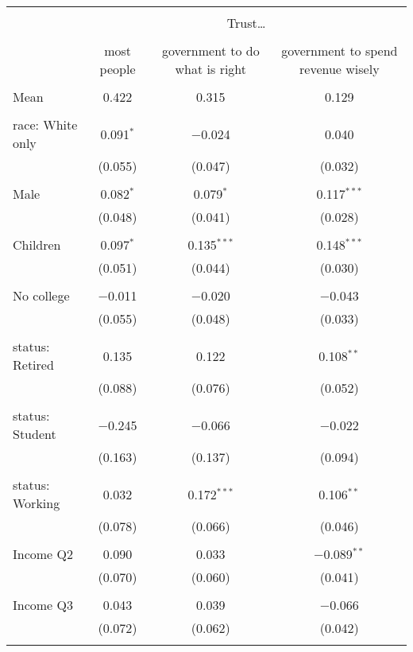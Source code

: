 
\begin{tabular}{@{\extracolsep{5pt}}lccc} 
\\[-1.8ex]\hline 
\hline \\[-1.8ex] 
 & \multicolumn{3}{c}{Trust…} \\ 
\cline{2-4} 
\\[-1.8ex] & most people & government to do what is right & government to spend revenue wisely \\ 
\hline \\[-1.8ex] 
 Mean & 0.422 & 0.315 & 0.129  \\ \hline \\[-1.8ex] race: White only & 0.091$^{*}$ & $-$0.024 & 0.040 \\ 
  & (0.055) & (0.047) & (0.032) \\ 
  & & & \\ 
 Male & 0.082$^{*}$ & 0.079$^{*}$ & 0.117$^{***}$ \\ 
  & (0.048) & (0.041) & (0.028) \\ 
  & & & \\ 
 Children & 0.097$^{*}$ & 0.135$^{***}$ & 0.148$^{***}$ \\ 
  & (0.051) & (0.044) & (0.030) \\ 
  & & & \\ 
 No college & $-$0.011 & $-$0.020 & $-$0.043 \\ 
  & (0.055) & (0.048) & (0.033) \\ 
  & & & \\ 
 status: Retired & 0.135 & 0.122 & 0.108$^{**}$ \\ 
  & (0.088) & (0.076) & (0.052) \\ 
  & & & \\ 
 status: Student & $-$0.245 & $-$0.066 & $-$0.022 \\ 
  & (0.163) & (0.137) & (0.094) \\ 
  & & & \\ 
 status: Working & 0.032 & 0.172$^{***}$ & 0.106$^{**}$ \\ 
  & (0.078) & (0.066) & (0.046) \\ 
  & & & \\ 
 Income Q2 & 0.090 & 0.033 & $-$0.089$^{**}$ \\ 
  & (0.070) & (0.060) & (0.041) \\ 
  & & & \\ 
 Income Q3 & 0.043 & 0.039 & $-$0.066 \\ 
  & (0.072) & (0.062) & (0.042) \\ 
  & & & \\ 

\end{tabular}
